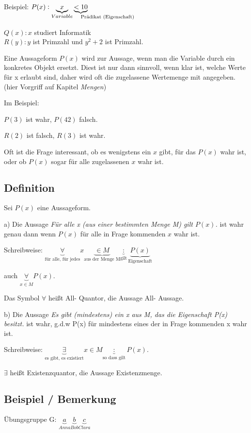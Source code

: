 \documentclass[a4paper, 12pt, twoside] {article}
\begin{document}
Beispiel:
$P(x): \underbrace{x}_{Variable} \underbrace{< 10}_{\mathrlap{\text{Prädikat (Eigenschaft)}}}$

$Q(x): x$ studiert Informatik \\
$R(y): y$ ist Primzahl und $y^2+2$ ist Primzahl.

Eine Aussageform $P(x)$ wird zur Aussage, wenn man die Variable durch ein konkretes Objekt ersetzt. Diest ist nur dann sinnvoll, wenn klar ist, welche Werte für x erlaubt sind, daher wird oft die zugelassene Wertemenge mit angegeben. (hier Vorgriff auf Kapitel \textit{Mengen})

Im Beispiel:

$P(3)$ ist wahr, $P(42)$ falsch.

$R(2)$ ist falsch, $R(3)$ ist wahr.

Oft ist die Frage interessant, ob es wenigstens ein $x$ gibt, für das $P(x)$ wahr ist, oder ob $P(x)$ sogar für alle zugelassenen $x$ wahr ist.

\subsection[Definition (Prädikatenlogik)]{Definition} %
Sei $P(x)$ eine Aussageform.

a) Die Aussage \textit{Für alle x (aus einer bestimmten Menge M) gilt $P(x)$.} ist wahr genau dann wenn $P(x)$ für alle in Frage kommenden $x$ wahr ist.

Schreibweise: $\underbrace{\forall}_{\text{für alle, für jedes}} x \underbrace{\in M}_{\text{aus der Menge M}} \underbrace{:}_{\text{gilt}} \underbrace{P(x)}_{\text{Eigenschaft}}$

auch $\underbrace{\forall}_{x \in M} P(x)$.

Das Symbol $\forall$ heißt All- Quantor, die Aussage All- Aussage.

b) Die Aussage \textit{Es gibt (mindestens) ein x aus M, das die Eigenschaft P(x) besitzt.} ist wahr, g.d.w P(x) für mindestens eines der in Frage kommenden x wahr ist.

Schreibweise: $\underbrace{\exists}_{\text{es gibt, es existiert}} x \in M \underbrace{:}_{\text{so dass gilt}} P(x)$.

$\exists$ heißt Existenzquantor, die Aussage Existenzmenge.

\subsection{Beispiel / Bemerkung} %
Übungsgruppe G:
$\underbrace{a}_{Anna} \underbrace{b}_{Bob} \underbrace{c}_{Clara}$
\end{document}
